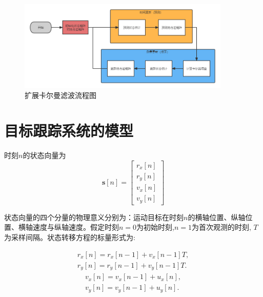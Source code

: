 \documentclass{article}
\begin{document}




\begin{figure}
    \centering
    \includegraphics[width = 0.9\textwidth]{imgs/EKF.png}
    \caption{扩展卡尔曼滤波流程图}
    \label{fig:EKFflow}
\end{figure}

\section{目标跟踪系统的模型}
时刻$n$的状态向量为
\begin{equation}
    \mathbf{s}[n]=\left[\begin{array}{l}
    r_{x}[n] \\
    r_{y}[n] \\
    v_{x}[n] \\
    v_{y}[n]
    \end{array}\right]
\end{equation}


状态向量的四个分量的物理意义分别为：运动目标在时刻$n$的横轴位置、纵轴位置、横轴速度与纵轴速度。假定时刻$n=0$为初始时刻,$n=1$为首次观测的时刻, $T$为采样间隔。状态转移方程的标量形式为:

\begin{equation}
\begin{array}{l}
    r_{x}[n]=r_{x}[n-1]+v_{x}[n-1] T,\\
    r_{y}[n]=r_{y}[n-1]+v_{y}[n-1] T.
\end{array}
\end{equation}
\begin{equation}
\begin{array}{l}
    v_{x}[n]=v_{x}[n-1]+u_{x}[n],\\
    v_{y}[n]=v_{y}[n-1]+u_{y}[n].
\end{array}
\end{equation}
\end{document}
